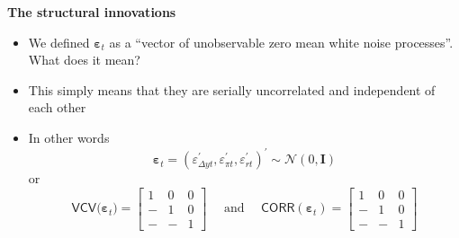 \documentclass[10pt,handout]{beamer}
\begin{document}
\vspace{.1cm}

\begin{frame}
{\textbf{The structural innovations}}

\begin{itemize}
\item We defined $\mathbf{\varepsilon }_{t}$ as a \textquotedblleft vector
of unobservable zero mean white noise processes\textquotedblright . What
does it mean?\medskip \pause

\item This simply means that they are serially uncorrelated and independent
of each other\medskip \pause

\item In other words 
\begin{equation*}
\mathbf{\varepsilon }_{t}=(\varepsilon _{\Delta yt}^{\prime },\varepsilon
_{\pi t}^{\prime },\varepsilon _{rt}^{\prime })^{\prime }\sim \mathcal{N}(0,%
\mathbf{I})
\end{equation*}%
or%
\begin{equation*}
\mathsf{VCV(}\mathbf{\varepsilon }_{t})=\left[ 
\begin{array}{ccc}
1 & 0 & 0 \\ 
- & 1 & 0 \\ 
- & - & 1%
\end{array}%
\right] \ \ \ \ \ \ \text{and}\ \ \ \ \ \ \mathsf{CORR}(\mathbf{\varepsilon }%
_{t})=\left[ 
\begin{array}{ccc}
1 & 0 & 0 \\ 
- & 1 & 0 \\ 
- & - & 1%
\end{array}%
\right]
\end{equation*}
\end{itemize}
\end{frame}

\vspace{0.1cm}

\everymath\expandafter{\the\everymath \color{note!99}}
\everydisplay\expandafter{\the\everydisplay \color{note!99}}%
\end{document}
